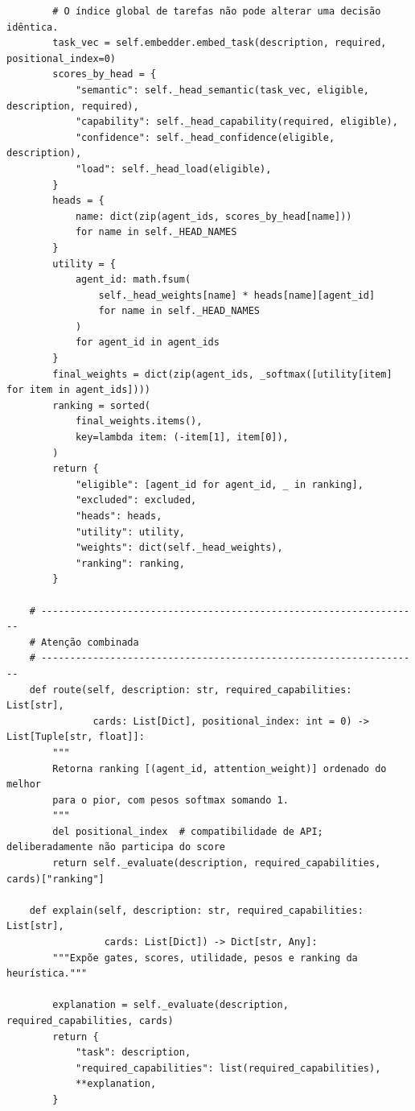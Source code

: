\documentclass[12pt,openany,oneside,a4paper,brazil,chapter=TITLE]{abntex2}
\begin{document}
\begin{lstlisting}
        # O índice global de tarefas não pode alterar uma decisão idêntica.
        task_vec = self.embedder.embed_task(description, required, positional_index=0)
        scores_by_head = {
            "semantic": self._head_semantic(task_vec, eligible, description, required),
            "capability": self._head_capability(required, eligible),
            "confidence": self._head_confidence(eligible, description),
            "load": self._head_load(eligible),
        }
        heads = {
            name: dict(zip(agent_ids, scores_by_head[name]))
            for name in self._HEAD_NAMES
        }
        utility = {
            agent_id: math.fsum(
                self._head_weights[name] * heads[name][agent_id]
                for name in self._HEAD_NAMES
            )
            for agent_id in agent_ids
        }
        final_weights = dict(zip(agent_ids, _softmax([utility[item] for item in agent_ids])))
        ranking = sorted(
            final_weights.items(),
            key=lambda item: (-item[1], item[0]),
        )
        return {
            "eligible": [agent_id for agent_id, _ in ranking],
            "excluded": excluded,
            "heads": heads,
            "utility": utility,
            "weights": dict(self._head_weights),
            "ranking": ranking,
        }

    # ------------------------------------------------------------------
    # Atenção combinada
    # ------------------------------------------------------------------
    def route(self, description: str, required_capabilities: List[str],
               cards: List[Dict], positional_index: int = 0) -> List[Tuple[str, float]]:
        """
        Retorna ranking [(agent_id, attention_weight)] ordenado do melhor
        para o pior, com pesos softmax somando 1.
        """
        del positional_index  # compatibilidade de API; deliberadamente não participa do score
        return self._evaluate(description, required_capabilities, cards)["ranking"]

    def explain(self, description: str, required_capabilities: List[str],
                 cards: List[Dict]) -> Dict[str, Any]:
        """Expõe gates, scores, utilidade, pesos e ranking da heurística."""

        explanation = self._evaluate(description, required_capabilities, cards)
        return {
            "task": description,
            "required_capabilities": list(required_capabilities),
            **explanation,
        }
\end{lstlisting}
\end{document}
